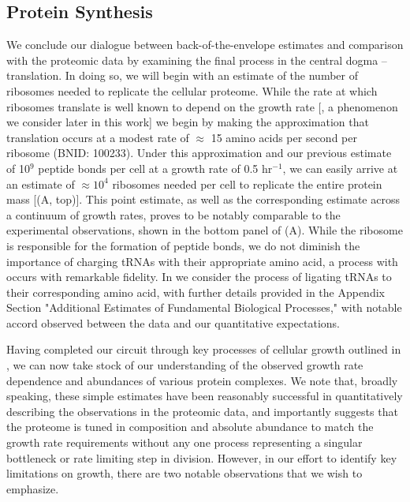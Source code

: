 \subsection{Protein Synthesis}
We conclude our dialogue between back-of-the-envelope estimates and
comparison with the proteomic data by examining the final process in the
central dogma -- translation. In doing so, we will begin with an estimate of
the number of ribosomes needed to replicate the cellular proteome. While the
rate at which ribosomes translate is well known to depend on the growth
rate [\cite{dai2018}, a phenomenon we consider later in this work] we begin by making
the approximation that translation occurs at a modest rate of $\approx$ 15
amino acids per second per ribosome (BNID: 100233). Under this approximation
and our previous estimate of 10$^{9}$ peptide bonds per cell at a growth rate
of 0.5 hr$^{-1}$, we can easily arrive at an estimate of $\approx 10^4$
ribosomes needed per cell to replicate the entire protein mass
[(A, top)]. This point estimate, as well as the
corresponding estimate across a continuum of growth rates, proves to be
notably comparable to the experimental observations, shown in the bottom
panel of (A). While the ribosome is responsible for
the formation of peptide bonds, we do not diminish the importance of charging
tRNAs with their appropriate amino acid, a process with occurs with
remarkable fidelity. In  we consider the process of ligating tRNAs
to their corresponding amino acid, with further details provided in the Appendix Section "Additional Estimates of Fundamental Biological Processes," with notable accord observed between the
data and our quantitative expectations.

Having completed our circuit through key processes of cellular growth
outlined in , we can now take stock of our understanding of the
observed growth rate dependence and abundances of various protein complexes. We
note that, broadly speaking, these simple estimates have been reasonably successful in
quantitatively describing the observations in the proteomic data, and importantly suggests
that the proteome is tuned in composition and absolute abundance to match the
growth rate requirements without any one process representing a singular
bottleneck or rate limiting step in division. However, in our effort to identify
key limitations on growth, there are two notable observations that we
wish to emphasize.

